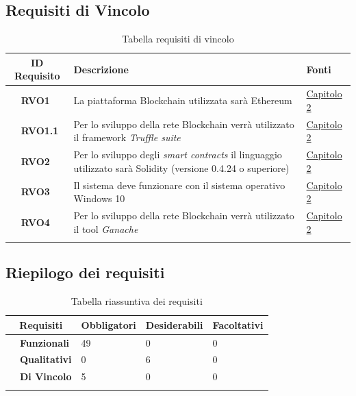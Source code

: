\subsection{Requisiti di Vincolo}
\begin{longtable}{|r l|p{10cm}|p{2cm}|}
	\hline
	\multicolumn{2}{|c|}{\textbf{ID Requisito}} & \textbf{Descrizione} & \textbf{Fonti}\tabularnewline
	\hline
	&\textbf{RVO1}& La piattaforma Blockchain utilizzata sarà Ethereum & \hyperref[cap:tecnologie_e_strumenti]{Capitolo 2}\\\hline
	&\textbf{RVO1.1}& Per lo sviluppo della rete Blockchain verrà utilizzato il \gls{framework} \textit{Truffle suite} & \hyperref[cap:tecnologie_e_strumenti]{Capitolo 2}\\\hline
	&\textbf{RVO2}& Per lo sviluppo degli \textit{smart contracts} il linguaggio utilizzato sarà Solidity (versione 0.4.24 o superiore) & \hyperref[cap:tecnologie_e_strumenti]{Capitolo 2}\\\hline
	&\textbf{RVO3}& Il sistema deve funzionare con il sistema operativo Windows 10 & \hyperref[cap:tecnologie_e_strumenti]{Capitolo 2}\\\hline
	&\textbf{RVO4}& Per lo sviluppo della rete Blockchain verrà utilizzato il tool \textit{Ganache} & \hyperref[cap:tecnologie_e_strumenti]{Capitolo 2}\\\hline
	\caption{Tabella requisiti di vincolo}
\end{longtable}
\subsection{Riepilogo dei requisiti}
\begin{longtable}{|r l|p{2cm}|p{2cm}|p{2cm}|}
		\hline
		\multicolumn{2}{|c|}{\textbf{Requisiti}} & \textbf{Obbligatori} & \textbf{Desiderabili} & \textbf{Facoltativi} \tabularnewline
		\hline
		&\textbf{Funzionali}&49&0&0\\\hline
		&\textbf{Qualitativi}&0&6&0\\\hline
		&\textbf{Di Vincolo}&5&0&0\\\hline
		\caption{Tabella riassuntiva dei requisiti}
	\end{longtable}